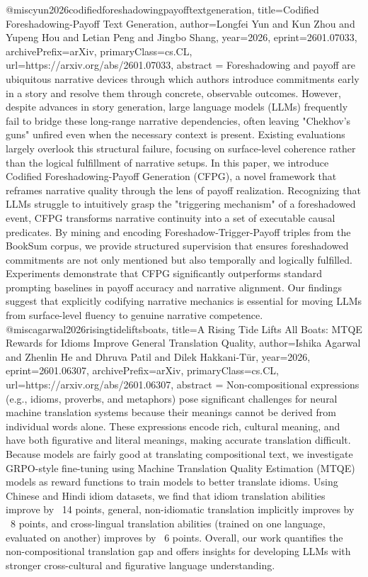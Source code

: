 {}@misc{yun2026codifiedforeshadowingpayofftextgeneration,
      title={Codified Foreshadowing-Payoff Text Generation}, 
      author={Longfei Yun and Kun Zhou and Yupeng Hou and Letian Peng and Jingbo Shang},
      year={2026},
      eprint={2601.07033},
      archivePrefix={arXiv},
      primaryClass={cs.CL},
      url={https://arxiv.org/abs/2601.07033},
      abstract = {Foreshadowing and payoff are ubiquitous narrative devices through which authors introduce commitments early in a story and resolve them through concrete, observable outcomes. However, despite advances in story generation, large language models (LLMs) frequently fail to bridge these long-range narrative dependencies, often leaving "Chekhov's guns" unfired even when the necessary context is present. Existing evaluations largely overlook this structural failure, focusing on surface-level coherence rather than the logical fulfillment of narrative setups. In this paper, we introduce Codified Foreshadowing-Payoff Generation (CFPG), a novel framework that reframes narrative quality through the lens of payoff realization. Recognizing that LLMs struggle to intuitively grasp the "triggering mechanism" of a foreshadowed event, CFPG transforms narrative continuity into a set of executable causal predicates. By mining and encoding Foreshadow-Trigger-Payoff triples from the BookSum corpus, we provide structured supervision that ensures foreshadowed commitments are not only mentioned but also temporally and logically fulfilled. Experiments demonstrate that CFPG significantly outperforms standard prompting baselines in payoff accuracy and narrative alignment. Our findings suggest that explicitly codifying narrative mechanics is essential for moving LLMs from surface-level fluency to genuine narrative competence.}
}@misc{agarwal2026risingtideliftsboats,
      title={A Rising Tide Lifts All Boats: MTQE Rewards for Idioms Improve General Translation Quality}, 
      author={Ishika Agarwal and Zhenlin He and Dhruva Patil and Dilek Hakkani-Tür},
      year={2026},
      eprint={2601.06307},
      archivePrefix={arXiv},
      primaryClass={cs.CL},
      url={https://arxiv.org/abs/2601.06307},
      abstract = {Non-compositional expressions (e.g., idioms, proverbs, and metaphors) pose significant challenges for neural machine translation systems because their meanings cannot be derived from individual words alone. These expressions encode rich, cultural meaning, and have both figurative and literal meanings, making accurate translation difficult. Because models are fairly good at translating compositional text, we investigate GRPO-style fine-tuning using Machine Translation Quality Estimation (MTQE) models as reward functions to train models to better translate idioms. Using Chinese and Hindi idiom datasets, we find that idiom translation abilities improve by ~14 points, general, non-idiomatic translation implicitly improves by ~8 points, and cross-lingual translation abilities (trained on one language, evaluated on another) improves by ~6 points. Overall, our work quantifies the non-compositional translation gap and offers insights for developing LLMs with stronger cross-cultural and figurative language understanding.}
}
